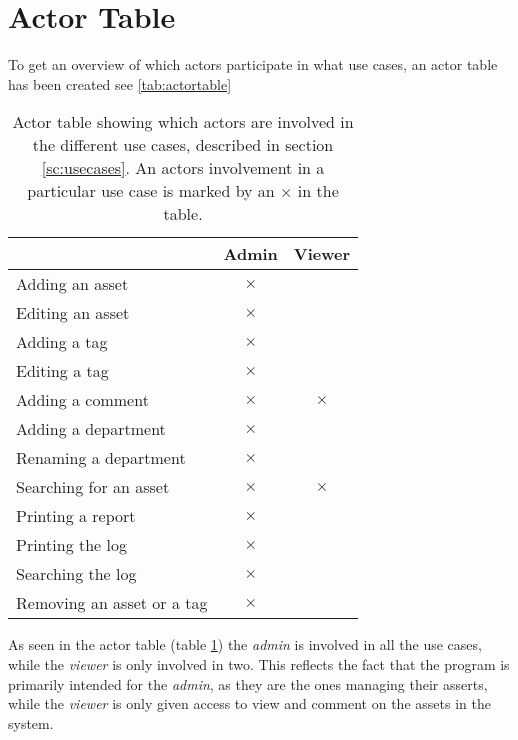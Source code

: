 \section{Actor Table}\label{sc:actortable}

To get an overview of which actors participate in what use cases, an actor table has been created see \autoref{tab:actortable}

\begin{table}[H]
    \centering
    \begin{tabular}{|l|c|c|}
        \hline
         & \textbf{Admin} & \textbf{Viewer}  \\
        \hline
        Adding an asset & $\pmb{\times}$ & \\
        \hline
        Editing an asset & $\pmb{\times}$ & \\
        \hline
        Adding a tag & $\pmb{\times}$ & \\
        \hline
        Editing a tag & $\pmb{\times}$ & \\
        \hline
        Adding a comment & $\pmb{\times}$ & $\pmb{\times}$ \\
        \hline
        Adding a department & $\pmb{\times}$ & \\
        \hline
        Renaming a department & $\pmb{\times}$ & \\
        \hline
        Searching for an asset & $\pmb{\times}$ & $\pmb{\times}$ \\
        \hline
        Printing a report & $\pmb{\times}$ & \\
        \hline
        Printing the log & $\pmb{\times}$ & \\
        \hline
        Searching the log & $\pmb{\times}$ & \\
        \hline
        Removing an asset or a tag & $\pmb{\times}$ & \\
        \hline
        
    \end{tabular}
    \caption{Actor table showing which actors are involved in the different use cases, described in section \ref{sc:usecases}. An actors involvement in a particular use case is marked by an $\pmb{\times}$ in the table.}
    \label{tab:actortable}
\end{table}

As seen in the actor table (table \ref{tab:actortable}) the \textit{admin} is involved in all the use cases, while the \textit{viewer} is only involved in two. This reflects the fact that the program is primarily intended for the \textit{admin}, as they are the ones managing their asserts, while the \textit{viewer} is only given access to view and comment on the assets in the system. 
